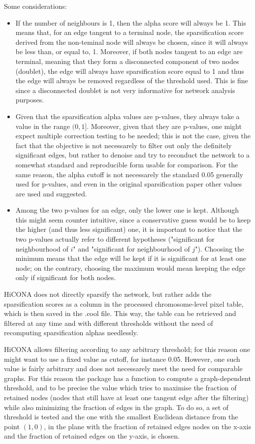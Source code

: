 Some considerations: 
\begin{itemize}\tightlist
  \item If the number of neighbours is 1, then the alpha score will always be 1. This means that, for an edge tangent to a terminal node, the sparsification score derived from the non-teminal node will always be chosen, since it will always be less than, or equal to, 1. Moreover, if both nodes tangent to an edge are terminal, meaning that they form a disconnected component of two nodes (doublet), the edge will always have sparsification score equal to 1 and thus the edge will always be removed regardless of the threshold used. This is fine since a disconnected doublet is not very informative for network analysis purposes.
  \item Given that the sparsification alpha values are p-values, they always take a value in the range $(0,1]$. Moreover, given that they are p-values, one might expect multiple correction testing to be needed; this is not the case, given the fact that the objective is not necessarely to filter out only the definitely significant edges, but rather to denoise and try to reconduct the network to a somewhat standard and reproducible form usable for comparison. For the same reason, the alpha cutoff is not necessarely the standard 0.05 generally used for p-values, and even in the original sparsification paper other values are used and suggested.
  \item Among the two p-values for an edge, only the lower one is kept. Although this might seem counter intuitive, since a conservative guess would be to keep the higher (and thus less significant) one, it is important to notice that the two p-values actually refer to different hypotheses ("significant for neighbourhood of $i$" and "significant for neighbourhood of $j$"). Choosing the minimum means that the edge will be kept if it is significant for at least one node; on the contrary, choosing the maximum would mean keeping the edge only if significant for both nodes.
\end{itemize}

HiCONA does not directly sparsify the network, but rather adds the sparsification scores as a column in the processed chromosome-level pixel table, which is then saved in the .cool file. This way, the table can be retrieved and filtered at any time and with different thresholds without the need of recomputing sparsification alphas needlessly.

HiCONA allows filtering according to any arbitrary threshold; for this reason one might want to use a fixed value as cutoff, for instance 0.05. However, one such value is fairly arbitrary and does not necessarely meet the need for comparable graphs. For this reason the package has a function to compute a graph-dependent threshold, and to be precise the value which tries to maximise the fraction of retained nodes (nodes that still have at least one tangent edge after the filtering) while also minimizing the fraction of edges in the graph. To do so, a set of threshold is tested and the one with the smallest Euclidean distance from the point $(1,0)$, in the plane with the fraction of retained edges nodes on the x-axis and the fraction of retained edges on the y-axis, is chosen.

